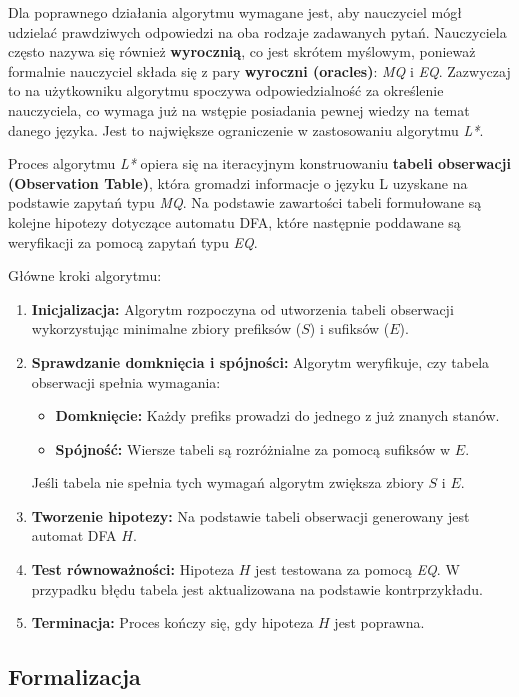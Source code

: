 Dla poprawnego działania algorytmu wymagane jest, aby nauczyciel mógł udzielać prawdziwych odpowiedzi na oba rodzaje zadawanych pytań. Nauczyciela często nazywa się również \textbf{wyrocznią}, co jest skrótem myślowym, ponieważ formalnie nauczyciel składa się z pary \textbf{wyroczni (oracles)}: \textit{MQ} i \textit{EQ}. Zazwyczaj to na użytkowniku algorytmu spoczywa odpowiedzialność za określenie nauczyciela, co wymaga już na wstępie posiadania pewnej wiedzy na temat danego języka. Jest to największe ograniczenie w zastosowaniu algorytmu \textit{L*}.

Proces algorytmu \textit{L*} opiera się na iteracyjnym konstruowaniu \textbf{tabeli obserwacji (Observation Table)}, która gromadzi informacje o języku L uzyskane na podstawie zapytań typu \textit{MQ}. Na podstawie zawartości tabeli formułowane są kolejne hipotezy dotyczące automatu DFA, które następnie poddawane są weryfikacji za pomocą zapytań typu \textit{EQ}.

Główne kroki algorytmu:
\begin{enumerate}
    \item \textbf{Inicjalizacja:} Algorytm rozpoczyna od utworzenia tabeli obserwacji wykorzystując minimalne zbiory prefiksów (\( S \)) i sufiksów (\( E \)).
    \item \textbf{Sprawdzanie domknięcia i spójności:} Algorytm weryfikuje, czy tabela obserwacji spełnia wymagania:
    \begin{itemize}
        \item \textbf{Domknięcie:} Każdy prefiks prowadzi do jednego z już znanych stanów.
        \item \textbf{Spójność:} Wiersze tabeli są rozróżnialne za pomocą sufiksów w \( E \).
    \end{itemize}
    Jeśli tabela nie spełnia tych wymagań algorytm zwiększa zbiory \( S \) i \( E \).
    \item \textbf{Tworzenie hipotezy:} Na podstawie tabeli obserwacji generowany jest automat DFA \( H \).
    \item \textbf{Test równoważności:} Hipoteza \( H \) jest testowana za pomocą \textit{EQ}. W przypadku błędu tabela jest aktualizowana na podstawie kontrprzykładu.
    \item \textbf{Terminacja:} Proces kończy się, gdy hipoteza \( H \) jest poprawna.
\end{enumerate}

\subsection{Formalizacja}

